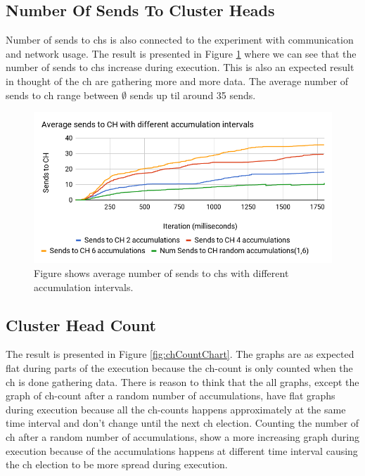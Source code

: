 \documentclass[USenglish]{uit-thesis}
\begin{document}
\subsection{Number Of Sends To Cluster Heads}
Number of sends to \gls{ch}s is also connected to the experiment  with communication and network usage. The result is presented in Figure \ref{fig:sendschChart} where we can see that the number of sends to \gls{ch}s increase during execution. This is also an expected result in thought of the \gls{ch} are gathering more and more data. The average number of sends to \gls{ch} range between $\emptyset$ sends up til around 35 sends.



\begin{figure} [ht]
\centering
\includegraphics[width=\textwidth]{sendschChart.png}
\caption{Figure shows average number of sends to \gls{ch}s with different accumulation intervals.}
\label{fig:sendschChart}
\end{figure}


\newpage

\subsection{Cluster Head Count}

The result is presented in Figure \ref{fig:chCountChart}. The graphs are as expected flat during parts of the execution because the \gls{ch}-count is only counted when the \gls{ch} is done gathering data.
There is reason to think that the all graphs, except the graph of \gls{ch}-count after a random number of accumulations, have flat graphs during execution because all the \gls{ch}-counts happens approximately at the same time interval and don't change until the next \gls{ch} election.
Counting the number of \gls{ch} after a random number of accumulations, show a more increasing graph during execution because of the accumulations happens at different time interval causing the \gls{ch} election to be more spread during execution.
\end{document}
